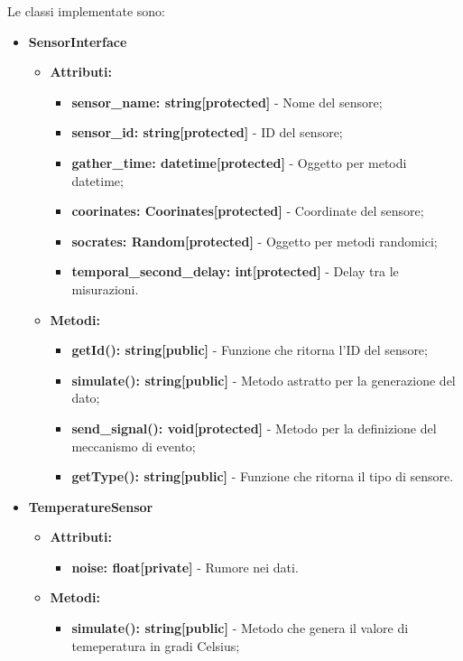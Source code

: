 \documentclass[8pt]{article}
\begin{document}
Le classi implementate sono:
\begin{itemize}
    \item \textbf{SensorInterface}
    \begin{itemize}
        \item \textbf{Attributi:}
        \begin{itemize}
            \item \textbf{sensor\_name: string[protected]} - Nome del sensore;
            \item \textbf{sensor\_id: string[protected]} - ID del sensore;
            \item \textbf{gather\_time: datetime[protected]} - Oggetto per metodi datetime;
            \item \textbf{coorinates: Coorinates[protected]} - Coordinate del sensore;
            \item \textbf{socrates: Random[protected]} - Oggetto per metodi randomici;
            \item \textbf{temporal\_second\_delay: int[protected]} - Delay tra le misurazioni.
        \end{itemize}
        \item \textbf{Metodi:}
        \begin{itemize}
            \item \textbf{getId(): string[public]} - Funzione che ritorna l'ID del sensore;
            \item \textbf{simulate(): string[public]} - Metodo astratto per la generazione del dato;
            \item \textbf{send\_signal(): void[protected]} - Metodo per la definizione del meccanismo di evento;
            \item \textbf{getType(): string[public]} - Funzione che ritorna il tipo di sensore.
        \end{itemize}
    \end{itemize}
    \item \textbf{TemperatureSensor}
    \begin{itemize}
        \item \textbf{Attributi:}
        \begin{itemize}
            \item \textbf{noise: float[private]} - Rumore nei dati.
        \end{itemize}
        \item \textbf{Metodi:}
        \begin{itemize}
            \item \textbf{simulate(): string[public]} - Metodo che genera il valore di temeperatura in gradi Celsius;

\end{itemize}
\end{itemize}
\end{itemize}
\end{document}
